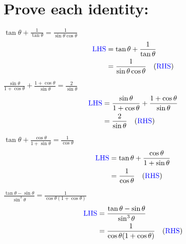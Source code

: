 \documentclass{article}
\begin{document}
\section{Prove each identity:}
\begin{multienum}
    \item $\tan \theta+\frac{1}{\tan \theta}=\frac{1}{\sin \theta \cos \theta}$
    \begin{align*}
        \text{\textcolor{blue}{LHS}} &= \tan \theta+\frac{1}{\tan \theta} \\
        &= \frac{1}{\sin \theta \cos \theta} \quad (\text{\textcolor{blue}{RHS}})
    \end{align*}

    \item $\frac{\sin \theta}{1+\cos \theta}+\frac{1+\cos \theta}{\sin \theta}=\frac{2}{\sin \theta}$
    \begin{align*}
        \text{\textcolor{blue}{LHS}} &= \frac{\sin \theta}{1+\cos \theta}+\frac{1+\cos \theta}{\sin \theta} \\
        &= \frac{2}{\sin \theta} \quad (\text{\textcolor{blue}{RHS}})
    \end{align*}

    \item $\tan \theta+\frac{\cos \theta}{1+\sin \theta}=\frac{1}{\cos \theta}$
    \begin{align*}
        \text{\textcolor{blue}{LHS}} &= \tan \theta+\frac{\cos \theta}{1+\sin \theta} \\
        &= \frac{1}{\cos \theta} \quad (\text{\textcolor{blue}{RHS}})
    \end{align*}

    \item $\frac{\tan \theta-\sin \theta}{\sin ^3 \theta}=\frac{1}{\cos \theta(1+\cos \theta)}$
    \begin{align*}
        \text{\textcolor{blue}{LHS}} &= \frac{\tan \theta-\sin \theta}{\sin ^3 \theta} \\
        &= \frac{1}{\cos \theta(1+\cos \theta)} \quad (\text{\textcolor{blue}{RHS}})
    \end{align*}
\end{multienum}
\end{document}
